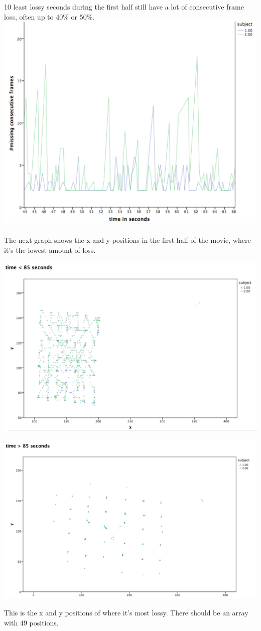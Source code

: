 \documentclass{article}
\begin{document}
10 least lossy seconds during the first half still have a lot of consecutive frame loss, often up to 40\% or 50\%.\\

\noindent \includegraphics[scale=0.4]{./img/consec_frames_zoom.png}
\\\\
\noindent The next graph shows the x and y positions in the first half of the movie, where it's the lowest amount of loss.

\noindent \includegraphics[scale=0.4]{./img/xy_first.png}

\noindent \includegraphics[scale=0.4]{./img/xy_last.png}

\noindent This is the x and y positions of where it's most lossy. There should be an array with 49 positions.\\
\end{document}
